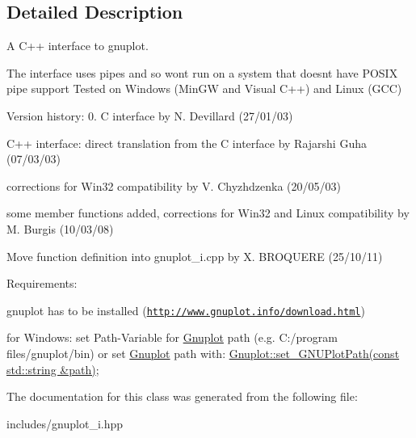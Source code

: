 \subsection{Detailed Description}
A C++ interface to gnuplot. 

The interface uses pipes and so won\textquotesingle{}t run on a system that doesn\textquotesingle{}t have P\+O\+S\+IX pipe support Tested on Windows (Min\+GW and Visual C++) and Linux (G\+CC)

Version history\+: 0. C interface by N. Devillard (27/01/03)
\begin{DoxyEnumerate}
\item C++ interface\+: direct translation from the C interface by Rajarshi Guha (07/03/03)
\item corrections for Win32 compatibility by V. Chyzhdzenka (20/05/03)
\item some member functions added, corrections for Win32 and Linux compatibility by M. Burgis (10/03/08)
\item Move function definition into gnuplot\+\_\+i.\+cpp by X. B\+R\+O\+Q\+U\+E\+RE (25/10/11)
\end{DoxyEnumerate}

Requirements\+:
\begin{DoxyItemize}
\item gnuplot has to be installed (\href{http://www.gnuplot.info/download.html}{\tt http\+://www.\+gnuplot.\+info/download.\+html})
\item for Windows\+: set Path-\/\+Variable for \hyperlink{class_gnuplot}{Gnuplot} path (e.\+g. C\+:/program files/gnuplot/bin) or set \hyperlink{class_gnuplot}{Gnuplot} path with\+: \hyperlink{class_gnuplot_a67cae885c26ced821e335d98986f1967}{Gnuplot\+::set\+\_\+\+G\+N\+U\+Plot\+Path(const std\+::string \&path)}; 
\end{DoxyItemize}

The documentation for this class was generated from the following file\+:\begin{DoxyCompactItemize}
\item 
includes/gnuplot\+\_\+i.\+hpp\end{DoxyCompactItemize}
